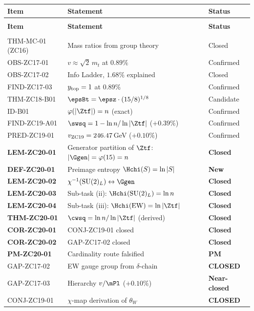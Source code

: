 \documentclass[12pt, a4paper]{article}
\begin{document}
\begin{formalbox}[title={Z-Programme Status after TASK-ZC20}]
{\small
\setlength{\LTpre}{4pt}
\setlength{\LTpost}{4pt}
\renewcommand{\arraystretch}{1.30}
\begin{longtable}{>{\raggedright\arraybackslash}p{3.6cm}
                  >{\raggedright\arraybackslash}p{5.8cm}
                  >{\centering\arraybackslash}p{2.4cm}}
\toprule
\textbf{Item} & \textbf{Statement} & \textbf{Status} \\
\midrule
\endfirsthead
\multicolumn{3}{l}{\small\textit{(continued)}}\\[4pt]
\toprule
\textbf{Item} & \textbf{Statement} & \textbf{Status} \\
\midrule
\endhead
\midrule
\multicolumn{3}{r}{\small\textit{(continues)}}\\
\endfoot
\bottomrule
\endlastfoot
THM-MC-01 (ZC16)   & Mass ratios from group theory & Closed \\
OBS-ZC17-01        & $v\approx\sqrt{2}\,m_t$ at $0.89\%$ & Confirmed \\
OBS-ZC17-02        & Info Ladder, $1.68\%$ explained & Closed \\
FIND-ZC17-03       & $y_{\rm top}=1$ at $0.89\%$ & Confirmed \\
\midrule
THM-ZC18-B01       & $\epsBt = \epsz\cdot(15/8)^{1/8}$ & Candidate \\
ID-B01             & $\varphi(|\Ztf|) = n$ (exact) & Confirmed \\
\midrule
FIND-ZC19-A01      & $\swsq = 1 - \ln n/\ln|\Ztf|$ ($+0.39\%$) & Confirmed \\
PRED-ZC19-01       & $v_{\rm ZC19} = 246.47$\,GeV ($+0.10\%$) & Confirmed \\
\midrule
\textbf{LEM-ZC20-01} & Generator partition of $\Ztf$:
  $|\Ggen| = \varphi(15) = n$ & \textbf{Closed} \\
\textbf{DEF-ZC20-01} & Preimage entropy $\Hchi(S) = \ln|S|$ & \textbf{New} \\
\textbf{LEM-ZC20-02} & $\chi^{-1}(\mathrm{SU}(2)_L) \leftrightarrow \Ggen$ & \textbf{Closed} \\
\textbf{LEM-ZC20-03} & Sub-task (ii): $\Hchi(\mathrm{SU}(2)_L) = \ln n$ & \textbf{Closed} \\
\textbf{LEM-ZC20-04} & Sub-task (iii): $\Hchi(\mathrm{EW}) = \ln|\Ztf|$ & \textbf{Closed} \\
\textbf{THM-ZC20-01} & $\cwsq = \ln n/\ln|\Ztf|$ (derived) & \textbf{Closed} \\
\textbf{COR-ZC20-01} & CONJ-ZC19-01 closed & \textbf{Closed} \\
\textbf{COR-ZC20-02} & GAP-ZC17-02 closed & \textbf{Closed} \\
\textbf{PM-ZC20-01}  & Cardinality route falsified & \textbf{PM} \\
\midrule
GAP-ZC17-02        & EW gauge group from $\delta$-chain & \textbf{CLOSED} \\
GAP-ZC17-03        & Hierarchy $v/\mPl$ ($+0.10\%$) & \textbf{Near-closed} \\
CONJ-ZC19-01       & $\chi$-map derivation of $\theta_W$ & \textbf{CLOSED} \\
\end{longtable}
}
\end{formalbox}
\end{document}
